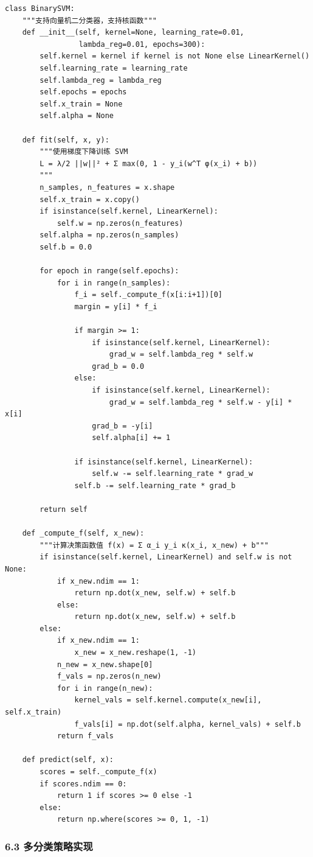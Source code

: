 \documentclass[12pt,a4paper]{ctexart}
\begin{document}
	\begin{lstlisting}
class BinarySVM:
	"""支持向量机二分类器，支持核函数"""
	def __init__(self, kernel=None, learning_rate=0.01, 
	             lambda_reg=0.01, epochs=300):
		self.kernel = kernel if kernel is not None else LinearKernel()
		self.learning_rate = learning_rate
		self.lambda_reg = lambda_reg
		self.epochs = epochs
		self.x_train = None
		self.alpha = None
	
	def fit(self, x, y):
		"""使用梯度下降训练 SVM
		L = λ/2 ||w||² + Σ max(0, 1 - y_i(w^T φ(x_i) + b))
		"""
		n_samples, n_features = x.shape
		self.x_train = x.copy()
		if isinstance(self.kernel, LinearKernel):
			self.w = np.zeros(n_features)
		self.alpha = np.zeros(n_samples)
		self.b = 0.0
		
		for epoch in range(self.epochs):
			for i in range(n_samples):
				f_i = self._compute_f(x[i:i+1])[0]
				margin = y[i] * f_i
				
				if margin >= 1:
					if isinstance(self.kernel, LinearKernel):
						grad_w = self.lambda_reg * self.w
					grad_b = 0.0
				else:
					if isinstance(self.kernel, LinearKernel):
						grad_w = self.lambda_reg * self.w - y[i] * x[i]
					grad_b = -y[i]
					self.alpha[i] += 1
				
				if isinstance(self.kernel, LinearKernel):
					self.w -= self.learning_rate * grad_w
				self.b -= self.learning_rate * grad_b
		
		return self

	def _compute_f(self, x_new):
		"""计算决策函数值 f(x) = Σ α_i y_i κ(x_i, x_new) + b"""
		if isinstance(self.kernel, LinearKernel) and self.w is not None:
			if x_new.ndim == 1:
				return np.dot(x_new, self.w) + self.b
			else:
				return np.dot(x_new, self.w) + self.b
		else:
			if x_new.ndim == 1:
				x_new = x_new.reshape(1, -1)
			n_new = x_new.shape[0]
			f_vals = np.zeros(n_new)
			for i in range(n_new):
				kernel_vals = self.kernel.compute(x_new[i], self.x_train)
				f_vals[i] = np.dot(self.alpha, kernel_vals) + self.b
			return f_vals
	
	def predict(self, x):
		scores = self._compute_f(x)
		if scores.ndim == 0:
			return 1 if scores >= 0 else -1
		else:
			return np.where(scores >= 0, 1, -1)
	\end{lstlisting}
	
	\subsubsection*{6.3 多分类策略实现}
	
\end{document}
